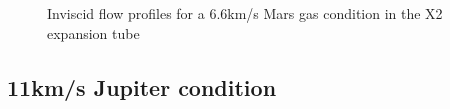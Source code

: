 \documentclass[a4paper,10pt]{article}
\begin{document}
\begin{figure}[htbp]
\begin{center}
{{      } \quad
      }
    \caption{Inviscid flow profiles for a 6.6km/s Mars gas condition in the X2 expansion tube}
    \label{fig:mars_profiles}
  \end{center}
\end{figure}

\newpage

\subsection{11km/s Jupiter condition}
\end{document}
